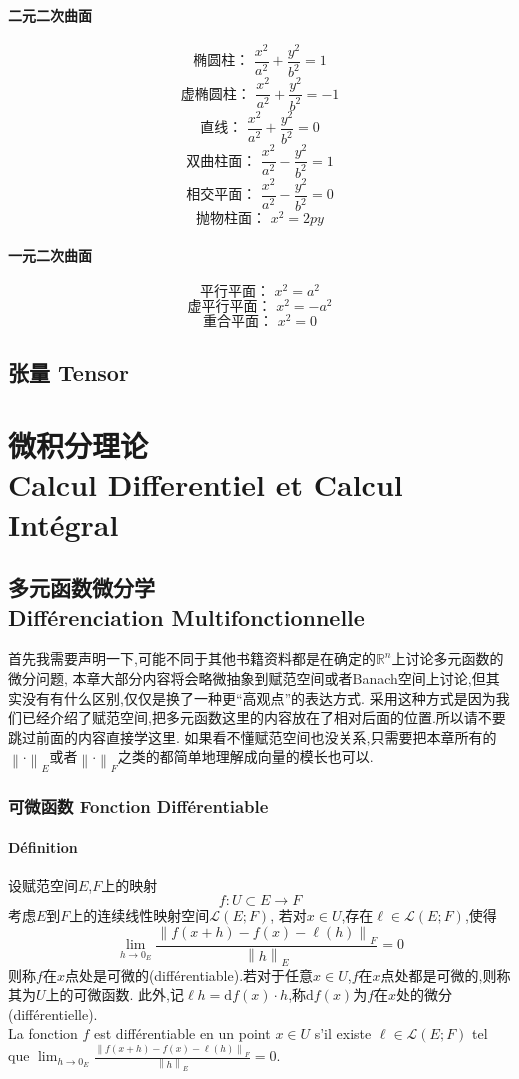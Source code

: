 \documentclass[12pt, a4paper, oneside]{ctexbook}
\newcommand{\di }{\text{d}}%
\newcommand{\R }{\mathbb{R}}%
\begin{document}
  \subsection{二元二次曲面}
    $$
    \text{椭圆柱： }\frac{x^2}{a^2}+\frac{y^2}{b^2}=1
    $$
    $$
    \text{虚椭圆柱： }\frac{x^2}{a^2}+\frac{y^2}{b^2}=-1
    $$
    $$
    \text{直线： }\frac{x^2}{a^2}+\frac{y^2}{b^2}=0
    $$
    $$
    \text{双曲柱面： }\frac{x^2}{a^2}-\frac{y^2}{b^2}=1
    $$
    $$
    \text{相交平面： }\frac{x^2}{a^2}-\frac{y^2}{b^2}=0
    $$
    $$
    \text{抛物柱面： }x^2=2py
    $$
  \subsection{一元二次曲面}
    $$
    \text{平行平面： }x^2=a^2
    $$
    $$
    \text{虚平行平面： }x^2=-a^2
    $$
    $$
    \text{重合平面： }x^2=0
    $$
  \chapter{张量 Tensor}


\part{微积分理论\\ Calcul Differentiel et Calcul Intégral}
\chapter{多元函数微分学\\ Différenciation Multifonctionnelle}
  首先我需要声明一下,可能不同于其他书籍资料都是在确定的$\R^n$上讨论多元函数的微分问题,
  本章大部分内容将会略微抽象到赋范空间或者Banach空间上讨论,但其实没有有什么区别,仅仅是换了一种更“高观点”的表达方式.
  采用这种方式是因为我们已经介绍了赋范空间,把多元函数这里的内容放在了相对后面的位置.所以请不要跳过前面的内容直接学这里.
  如果看不懂赋范空间也没关系,只需要把本章所有的$\left\lVert \cdot \right\rVert _E$或者$\left\lVert \cdot \right\rVert _F$之类的都简单地理解成向量的模长也可以.
\section{可微函数 Fonction Différentiable}
  \subsection{Définition}
    设赋范空间$E$,$F$上的映射
    $$
    f:U\subset E\rightarrow F
    $$
    考虑$E$到$F$上的连续线性映射空间$\mathcal{L}(E;F)$,
    若对$x\in U$,存在$\ell\in \mathcal{L}(E;F)$,使得
    $$
      \lim_{h \to 0_E}\frac{\left\lVert f(x+h)-f(x)-\ell(h)\right\rVert _F }{\left\lVert h\right\rVert _E}  =0
    $$
    则称$f$在$x$点处是可微的(différentiable).若对于任意$x\in U$,$f$在$x$点处都是可微的,则称其为$U$上的可微函数.
    此外,记$\ell h=\di f(x)\cdot h$,称$\di f(x)$为$f$在$x$处的微分(différentielle).\\
    \indent
    La fonction $f$ est différentiable en un point $x\in U$ s'il existe $\ell\in \mathcal{L}(E; F) $ tel que 
    $\lim_{h \to 0_E}\frac{\left\lVert f(x+h)-f(x)-\ell(h)\right\rVert _F }{\left\lVert h\right\rVert _E}  =0$.
\end{document}
